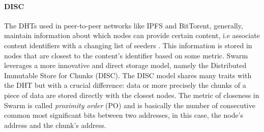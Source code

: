 \paragraph{DISC}\label{par:disc}
The DHTs used in peer-to-peer networks like IPFS and BitTorent, generally, maintain information about which nodes can provide certain content, i.e associate content identifiers with a changing list of seeders \citep{crosby_2007, jimenez_2009}. This information is stored in nodes that are closest to the content's identifier based on some metric. Swarm leverages a more innovative and direct storage model, namely the Distributed Immutable Store for Chunks (DISC). The DISC model shares many traits with the DHT but with a crucial difference: data or more precisely the chunks of a piece of data are stored directly with the closest nodes. The metric of closeness in Swarm is called \textit{proximity order} (PO) and is basically the number of consecutive common most significant bits between two addresses, in this case, the node's address and the chunk's address. 


